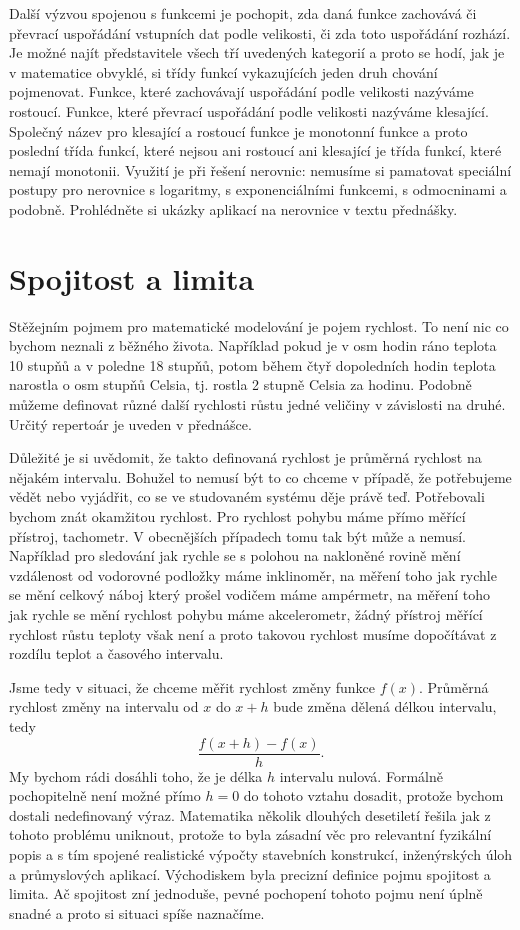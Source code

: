 \documentclass[12pt]{article}
\begin{document}
Další výzvou spojenou s funkcemi je pochopit, zda daná funkce zachovává či převrací uspořádání vstupních dat podle velikosti, či zda toto uspořádání rozhází. Je možné najít představitele všech tří uvedených kategorií a proto se hodí, jak je v matematice obvyklé, si třídy funkcí vykazujících jeden druh chování pojmenovat. Funkce, které zachovávají uspořádání podle velikosti nazýváme rostoucí. Funkce, které převrací uspořádání podle velikosti nazýváme klesající. Společný název pro klesající a rostoucí funkce je monotonní funkce a proto poslední třída funkcí, které nejsou ani rostoucí ani klesající je třída funkcí, které nemají monotonii. Využití je při řešení nerovnic: nemusíme si pamatovat speciální postupy pro nerovnice s logaritmy, s exponenciálními funkcemi, s odmocninami a podobně. Prohlédněte si ukázky aplikací na nerovnice v textu přednášky.

\newpage
\section*{Spojitost a limita}

Stěžejním pojmem pro matematické modelování je pojem rychlost. To není nic co bychom neznali z běžného života. Například pokud je v osm hodin ráno teplota 10 stupňů a v poledne 18 stupňů, potom během čtyř dopoledních hodin teplota narostla o osm stupňů Celsia, tj. rostla 2 stupně Celsia za hodinu. Podobně můžeme definovat různé další rychlosti růstu jedné veličiny v závislosti na druhé. Určitý repertoár je uveden v přednášce.

Důležité je si uvědomit, že takto definovaná rychlost je průměrná rychlost na nějakém intervalu. Bohužel to nemusí být to co chceme v případě, že potřebujeme vědět nebo vyjádřit, co se ve studovaném systému děje právě teď. Potřebovali bychom znát okamžitou rychlost. Pro rychlost pohybu máme přímo měřící přístroj, tachometr. V obecnějších případech tomu tak být může a nemusí. Například pro sledování jak rychle se s polohou na nakloněné rovině mění vzdálenost od vodorovné podložky máme inklinoměr, na měření toho jak rychle se mění celkový náboj který prošel vodičem máme ampérmetr, na měření toho jak rychle se mění rychlost pohybu máme akcelerometr, žádný přístroj měřící rychlost růstu teploty však není a proto takovou rychlost musíme dopočítávat z rozdílu teplot a časového intervalu.

Jsme tedy v situaci, že chceme měřit rychlost změny funkce $f(x)$. Průměrná rychlost změny na intervalu od $x$ do $x+h$ bude změna dělená délkou intervalu, tedy $$\frac{f(x+h)-f(x)}{h}.$$ My bychom rádi dosáhli toho, že je délka $h$ intervalu nulová. Formálně pochopitelně není možné přímo $h=0$ do tohoto vztahu dosadit, protože bychom dostali nedefinovaný výraz. Matematika několik dlouhých desetiletí řešila jak z tohoto problému uniknout, protože to byla zásadní věc pro relevantní fyzikální popis a s tím spojené realistické výpočty stavebních konstrukcí, inženýrských úloh a průmyslových aplikací. Východiskem byla precizní definice pojmu spojitost a limita. Ač spojitost zní jednoduše, pevné pochopení tohoto pojmu není úplně snadné a proto si situaci spíše naznačíme.
\end{document}
